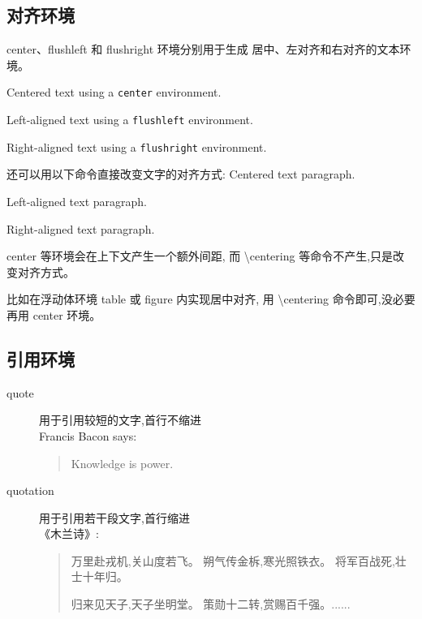 \documentclass[a4paper]{ctexart}
\begin{document}
    \subsection{对齐环境}
    center、flushleft 和 flushright 环境分别用于生成%
    居中、左对齐和右对齐的文本环境。
    \begin{center}
        Centered text using a
        \verb|center| environment.
    \end{center}
    \begin{flushleft}
        Left-aligned text using a
        \verb|flushleft| environment.
    \end{flushleft}
    \begin{flushright}
        Right-aligned text using a
        \verb|flushright| environment.
    \end{flushright}
    还可以用以下命令直接改变文字的对齐方式:
    \centering
    Centered text paragraph.\par
    \raggedright
    Left-aligned text paragraph.\par
    \raggedleft
    Right-aligned text paragraph.\par
    \begin{flushleft}
        center 等环境会在上下文产生一个额外间距,%
        而 \textbackslash centering 等命令不产生,只是改变对齐方式。%
    \end{flushleft}
    \raggedright
    比如在浮动体环境 table 或 figure 内实现居中对齐,%
    用 \textbackslash centering 命令即可,没必要再用 center 环境。
    \subsection{引用环境}
    \begin{description}
        \item[quote] 用于引用较短的文字,首行不缩进\\
        Francis Bacon says:
        \begin{quote}
            Knowledge is power.
        \end{quote}
        \item[quotation] 用于引用若干段文字,首行缩进\\
        《木兰诗》:
        \begin{quotation}
            万里赴戎机,关山度若飞。
            朔气传金柝,寒光照铁衣。
            将军百战死,壮士十年归。

            归来见天子,天子坐明堂。
            策勋十二转,赏赐百千强。......
        \end{quotation} 
    \end{description}
\end{document}
